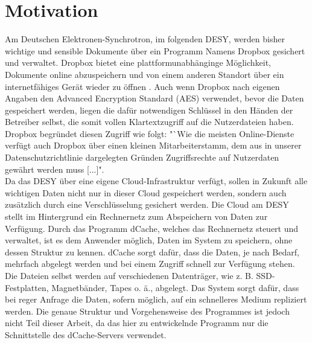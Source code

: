 \documentclass[10pt, a4paper,headsepline]{scrreprt}
\begin{document}
\section{Motivation}
Am Deutschen Elektronen-Synchrotron, im folgenden DESY, werden bisher wichtige und sensible Dokumente über ein Programm Namens Dropbox gesichert und verwaltet. Dropbox bietet eine plattformunabhänginge Möglichkeit, Dokumente online abzuspeichern und von einem anderen Standort über ein internetfähiges Gerät wieder zu öffnen \cite{website:dropbox-main}. Auch wenn Dropbox nach eigenen Angaben den Advanced Encryption Standard (AES)  verwendet, bevor die Daten gespeichert werden, liegen die dafür notwendigen Schlüssel in den Händen der Betreiber selbst, die somit vollen Klartextzugriff auf die Nutzerdateien haben. Dropbox begründet diesen Zugriff wie folgt:  "`Wie die meisten Online-Dienste verfügt auch Dropbox über einen kleinen Mitarbeiterstamm, dem aus in unserer Datenschutzrichtlinie dargelegten Gründen Zugriffsrechte auf Nutzerdaten gewährt werden muss [...]". \cite{website:dropbox-help} \\
Da das DESY über eine eigene Cloud-Infrastruktur verfügt, sollen in Zukunft alle wichtigen Daten nicht nur in dieser Cloud gespeichert werden, sondern auch zusätzlich durch eine Verschlüsselung gesichert werden. Die Cloud am DESY stellt im Hintergrund ein Rechnernetz zum Abspeichern von Daten zur Verfügung. Durch das Programm dCache, welches das Rechnernetz steuert und verwaltet, ist es dem Anwender möglich, Daten im System zu speichern, ohne dessen Struktur zu kennen. dCache sorgt dafür, dass die Daten, je nach Bedarf, mehrfach abgelegt werden und bei einem Zugriff schnell zur Verfügung stehen. Die Dateien selbst werden auf verschiedenen Datenträger, wie z. B. SSD-Festplatten, Magnetbänder, Tapes o. ä., abgelegt. Das System sorgt dafür, dass bei reger Anfrage die Daten, sofern möglich, auf ein schnelleres Medium repliziert werden. Die genaue Struktur und Vorgehensweise des Programmes ist jedoch nicht Teil dieser Arbeit, da das hier zu entwickelnde Programm nur die Schnittstelle des dCache-Servers verwendet.
\end{document}
